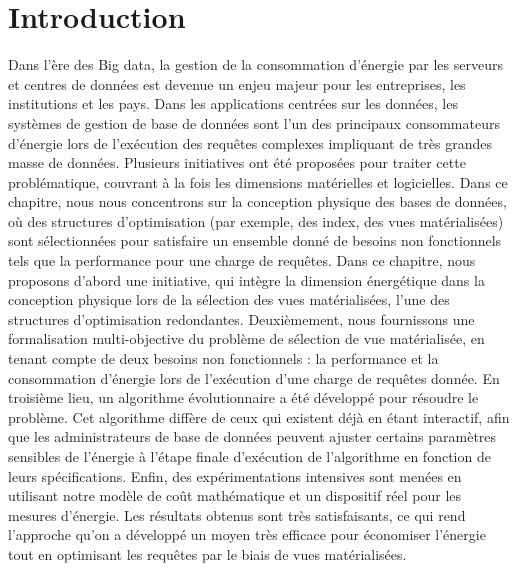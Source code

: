 \section{Introduction}
Dans l'ère des Big data, la gestion de la consommation d'énergie par les serveurs et centres de données est devenue un enjeu majeur pour les entreprises, les institutions et les pays. Dans les applications centrées sur les données, les systèmes de gestion de base de données sont l'un des principaux consommateurs d'énergie lors de l'exécution des requêtes complexes impliquant de très grandes masse de données. Plusieurs initiatives ont été proposées pour traiter cette problématique, couvrant à la fois les dimensions matérielles et logicielles. Dans ce chapitre, nous nous concentrons sur la conception physique des bases de données, où des structures d'optimisation (par exemple, des index, des vues matérialisées) sont sélectionnées pour satisfaire un ensemble donné de besoins non fonctionnels tels que la performance pour une charge de requêtes. Dans ce chapitre, nous proposons d'abord une initiative, qui intègre la dimension énergétique dans la conception physique lors de la sélection des vues matérialisées, l'une des structures d'optimisation redondantes. Deuxièmement, nous fournissons une formalisation multi-objective du problème de sélection de vue matérialisée, en tenant compte de deux besoins non fonctionnels : la performance et la consommation d'énergie lors de l'exécution d'une charge de requêtes donnée. En troisième lieu, un algorithme évolutionnaire a été développé pour résoudre le problème. Cet algorithme diffère de ceux qui existent déjà en étant interactif, afin que les administrateurs de base de données peuvent ajuster certains paramètres sensibles de l'énergie à l'étape finale d'exécution de l'algorithme en fonction de leurs spécifications. Enfin, des expérimentations intensives sont menées en utilisant notre modèle de coût mathématique et un dispositif réel pour les mesures d'énergie. Les résultats obtenus sont très satisfaisants, ce qui rend l'approche qu'on a développé un moyen très efficace pour économiser l'énergie tout en optimisant les requêtes par le biais de vues matérialisées.

